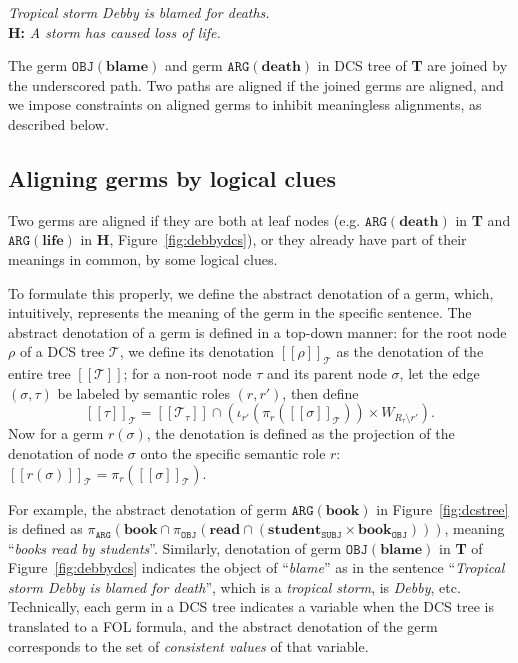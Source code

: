 \documentclass[11pt]{article}
\def\den#1{[\![#1]\!]}
\begin{document}
\vspace{4pt}
 \textit{Tropical storm Debby is blamed for deaths.}\\
{\bf H:} \textit{A storm has caused loss of life.}
\vspace{4pt}

\noindent The germ $\texttt{OBJ}(\textbf{blame})$ and 
germ $\texttt{ARG}(\textbf{death})$ in DCS tree of {\bf T} are joined by the 
underscored path. Two paths are aligned if the joined germs are aligned, 
and we impose constraints on aligned germs to inhibit meaningless alignments, 
as described below. 

\subsection{Aligning germs by logical clues}

Two germs are aligned if they are both at leaf nodes (e.g. 
$\texttt{ARG}(\textbf{death})$ in {\bf T} and $\texttt{ARG}(\textbf{life})$ in {\bf H}, 
Figure~\ref{fig:debbydcs}), 
or they already have part of their meanings in common, by some logical clues. 

To formulate this properly, we define the abstract denotation of a germ, which, 
intuitively, represents the meaning of the germ in the specific sentence. 
The abstract denotation of a germ is defined in a top-down manner: 
for the root node $\rho$ of a DCS tree $\mathcal{T}$, 
we define its denotation $\den{\rho}_{\mathcal{T}}$ as the denotation 
of the entire tree $\den{\mathcal{T}}$; for a non-root node $\tau$ and its 
parent node $\sigma$, let the edge $(\sigma,\tau)$ be labeled by semantic roles 
$(r,r')$, then define 
$$
\den{\tau}_{\mathcal{T}}=\den{\mathcal{T}_{\tau}}\cap(\iota_{r'}
(\pi_{r}(\den{\sigma}_{\mathcal{T}}))\times W_{R_{\tau}\setminus r'}). 
$$
Now for a germ $r(\sigma)$, the denotation is defined as the projection of the denotation of 
node $\sigma$ onto the specific semantic role $r$: 
$\den{r(\sigma)}_{\mathcal{T}}=\pi_r(\den{\sigma}_{\mathcal{T}})$. 

For example, the abstract denotation of germ $\texttt{ARG}(\textbf{book})$ in 
Figure~\ref{fig:dcstree} is defined as $\pi_{\texttt{ARG}}(\textbf{book}\cap\pi_{\texttt{OBJ}}(\textbf{read}\cap(\textbf{student}_{\texttt{SUBJ}}\times\textbf{book}_{\texttt{OBJ}})))$, 
meaning ``\emph{books read by students}''. 
Similarly, denotation of germ $\texttt{OBJ}(\textbf{blame})$ in {\bf T} of 
Figure~\ref{fig:debbydcs} indicates the object of ``\textit{blame}'' as in the sentence 
``\textit{Tropical storm Debby is blamed for death}'', which is a \textit{tropical storm}, 
is \textit{Debby}, etc. 
Technically, each germ in a DCS tree indicates a variable when the DCS tree is translated to 
a FOL formula, and the abstract denotation of the germ corresponds to the set of 
\emph{consistent values} \cite{liang11} of that variable. 
\end{document}
